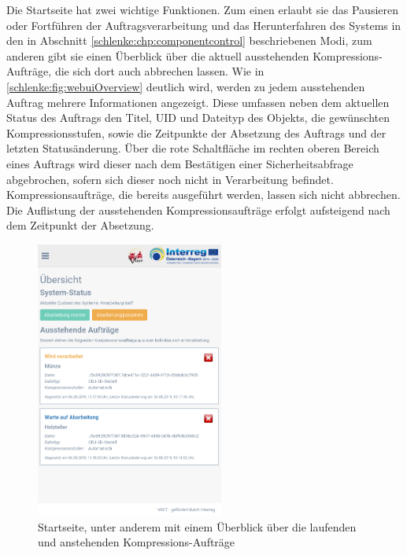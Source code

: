 Die Startseite hat zwei wichtige Funktionen. Zum einen erlaubt sie das Pausieren oder Fortführen der Auftragsverarbeitung und das Herunterfahren des Systems in den in Abschnitt \ref{schlenke:chp:componentcontrol} beschriebenen Modi, zum anderen gibt sie einen Überblick über die aktuell ausstehenden Kompressions-Aufträge, die sich dort auch abbrechen lassen. Wie in \autoref{schlenke:fig:webuiOverview} deutlich wird, werden zu jedem ausstehenden Auftrag mehrere Informationen angezeigt. Diese umfassen neben dem aktuellen Status des Auftrags den Titel, UID und Dateityp des Objekts, die gewünschten Kompressionsstufen, sowie die Zeitpunkte der Absetzung des Auftrags und der letzten Statusänderung. Über die rote Schaltfläche im rechten oberen Bereich eines Auftrags wird dieser nach dem Bestätigen einer Sicherheitsabfrage abgebrochen, sofern sich dieser noch nicht in Verarbeitung befindet. Kompressionsaufträge, die bereits ausgeführt werden, lassen sich nicht abbrechen. Die Auflistung der ausstehenden Kompressionsaufträge erfolgt aufsteigend nach dem Zeitpunkt der Absetzung.

\begin{figure}
\begin{center}
\includegraphics[width=0.55\textwidth]{Figures/schlenker/webui/overview.png}
\caption{Startseite, unter anderem mit einem Überblick über die laufenden und anstehenden Kompressions-Aufträge}
\label{schlenke:fig:webuiOverview}
\end{center}
\end{figure}

